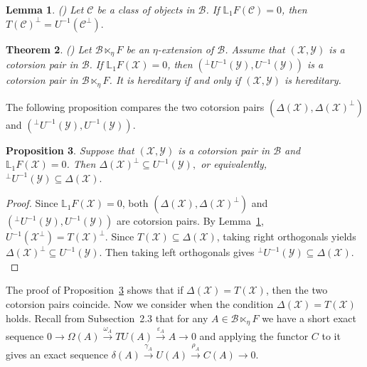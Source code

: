 \documentclass[11pt,reqno]{amsart}
\numberwithin{equation}{section}
\newtheorem{theorem}{Theorem}[section]
\newtheorem{lemma}[theorem]{Lemma}
\newtheorem{proposition}[theorem]{Proposition}
\newcommand{\cB}{\mathcal B}
\newcommand{\cX}{\mathcal X}
\newcommand{\cY}{\mathcal Y}
\newcommand{\cC}{\mathcal C}
\begin{document}
\begin{lemma}\label{lem:T-orthogonal}
{\rm (\cite[Lemma 3.6]{Hu})}
Let $\cC$ be a class of objects in $\cB$. If $\mathbb{L}_1F(\cC)=0$, then
$
T(\cC)^\perp=U^{-1}(\cC^\perp).
$
\end{lemma}


\begin{theorem}\label{thm:U-cotorsion}
{\rm (\cite[Theorem 3.5]{Hu})}
Let $\cB\ltimes_\eta F$ be an $\eta$-extension of $\cB$. Assume that $(\cX,\cY)$ is a cotorsion pair in $\cB$. If $\mathbb{L}_1F(\cX)=0$, then
$
({}^\perp U^{-1}(\cY),U^{-1}(\cY))
$
is a cotorsion pair in $\cB\ltimes_\eta F$. It is hereditary if and only if $(\cX,\cY)$ is hereditary.
\end{theorem}


The following proposition compares the two cotorsion pairs
$
(\Delta(\cX),\Delta(\cX)^\perp)
$ and
$
({}^\perp U^{-1}(\cY),U^{-1}(\cY)).
$

\begin{proposition}\label{prop:relation}
Suppose that $(\cX,\cY)$ is a cotorsion pair in $\cB$ and $\mathbb{L}_1F(\cX)=0$. Then
$
\Delta(\cX)^\perp\subseteq U^{-1}(\cY),
$
or equivalently,
$
{}^\perp U^{-1}(\cY)\subseteq\Delta(\cX).
$
\end{proposition}

\begin{proof}
Since $\mathbb{L}_1F(\cX)=0$, both $(\Delta(\cX),\Delta(\cX)^\perp)$ and $({}^\perp U^{-1}(\cY),U^{-1}(\cY))$ are cotorsion pairs. By Lemma~\ref{lem:T-orthogonal},
$
U^{-1}(\cX^\perp)=T(\cX)^\perp.
$
Since $T(\cX)\subseteq \Delta(\cX)$, taking right orthogonals yields
$
\Delta(\cX)^\perp\subseteq U^{-1}(\cY).
$
Then taking left orthogonals gives
$
{}^\perp U^{-1}(\cY)\subseteq\Delta(\cX).
$
\end{proof}

The proof of Proposition~\ref{prop:relation} shows that if $\Delta(\cX)=T(\cX)$, then the two cotorsion pairs coincide. Now we consider when the condition $\Delta(\cX)=T(\cX)$ holds.
Recall from Subsection~2.3 that for any $A\in \cB\ltimes_\eta F$ we have a short exact sequence $0\rightarrow \Omega(A)\xrightarrow{\omega_{A}} TU(A)\xrightarrow{\varepsilon_{A}} A\rightarrow 0$ and applying the functor $C$ to it gives an exact sequence
$\delta(A)\xrightarrow{\gamma_A} U(A)\xrightarrow{\rho_A} C(A)\rightarrow 0$.
\end{document}
